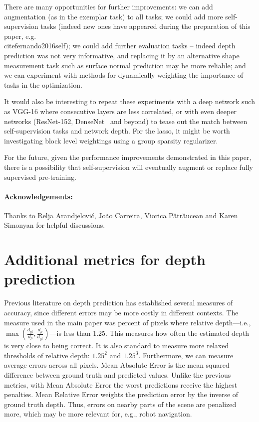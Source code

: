 \documentclass[10pt,twocolumn,letterpaper]{article}
\begin{document}
There are many opportunities for further improvements: we can add
augmentation (as in the exemplar task) to all tasks; we could add more
self-supervision tasks (indeed new ones have appeared during the
preparation of this paper, e.g.\\cite{fernando2016self});
we could add further evaluation tasks -- indeed 
depth prediction was not very informative, and replacing it by an alternative shape measurement task such as 
 surface normal prediction may be more reliable;
and we can
experiment with methods for dynamically weighting the importance of
tasks in the optimization. 

It would also be interesting to repeat
these experiments with a deep network such as VGG-16 where
consecutive layers are less correlated,
or with even deeper networks
(ResNet-152, DenseNet~\cite{huang2016densely} and beyond) to tease out
the match between self-supervision tasks and network depth. For the lasso, it might
be worth investigating block level weightings using a group sparsity regularizer.

For the future, given the performance improvements demonstrated in this paper, there is a 
possibility that self-supervision will eventually augment or replace
fully supervised pre-training.


\begin{small}
\paragraph{Acknowledgements:}
Thanks to Relja Arandjelovi\'c, Jo\~{a}o Carreira, Viorica P\u{a}tr\u{a}ucean and Karen Simonyan for helpful discussions.
\end{small}

\appendix
\section{Additional metrics for depth prediction}
\label{appendix:depth}
Previous literature on depth prediction has established several measures of accuracy, since different errors may be more costly in different contexts.  
The measure used in the main paper was percent of pixels where relative depth---i.e., $\max\left(\frac{d_{gt}}{d_{p}},\frac{d_{p}}{d_{gt}}\right)$---is less than 1.25.
This measures how often the estimated depth is very close to being correct.  
It is also standard to measure more relaxed thresholds of relative depth: $1.25^2$ and $1.25^3$.
Furthermore, we can measure average errors across all pixels.
Mean Absolute Error is the mean squared difference between ground truth and predicted values.
Unlike the previous metrics, with Mean Absolute Error the worst predictions receive the highest penalties.
Mean Relative Error weights the prediction error by the inverse of ground truth depth.  
Thus, errors on nearby parts of the scene are penalized more, which may be more relevant for, e.g., robot navigation.
\end{document}
